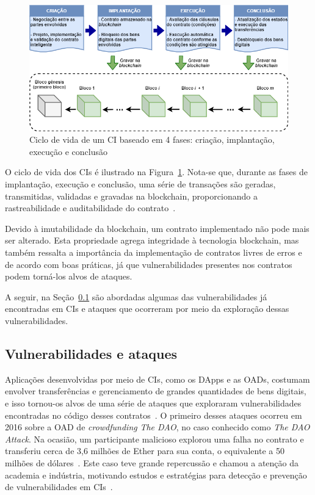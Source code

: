 \begin{figure}[htb]
 \caption{Ciclo de vida de um CI baseado em 4 fases: criação, implantação, execução e conclusão}
 \label{fig:contrato-ciclo-de-vida}
 \centering
 \includegraphics[scale=0.6]{figuras/contrato_ciclo_de_vida.png}
\end{figure}

O ciclo de vida dos CIs é ilustrado na Figura~\ref{fig:contrato-ciclo-de-vida}. Nota-se que, durante as fases de implantação, execução e conclusão, uma série de transações são geradas, transmitidas, validadas e gravadas na blockchain, proporcionando a rastreabilidade e auditabilidade do contrato~\cite{overview-smartcontracts2020zheng}.

Devido à imutabilidade da blockchain, um contrato implementado não pode mais ser alterado. Esta propriedade agrega integridade à tecnologia blockchain, mas também ressalta a importância da implementação de contratos livres de erros e de acordo com boas práticas, já que vulnerabilidades presentes nos contratos podem torná-los alvos de ataques.

A seguir, na Seção~\ref{tex:fund:ethereum:vuln-ataques} são abordadas algumas das vulnerabilidades já encontradas em CIs e ataques que ocorreram por meio da exploração dessas vulnerabilidades.  

\subsection{Vulnerabilidades e ataques} \label{tex:fund:ethereum:vuln-ataques}

Aplicações desenvolvidas por meio de CIs, como os DApps e as OADs, costumam envolver transferências e gerenciamento de grandes quantidades de bens digitais, e isso tornou-os alvos de uma série de ataques que exploraram vulnerabilidades encontradas no código desses contratos~\cite{atzei2017survey-attacks-sok, liu2019survey-ieeeaccess, chen2020survey-ethereum-acm}. O primeiro desses ataques ocorreu em 2016 sobre a OAD de \textit{crowdfunding} \textit{The DAO}, no caso conhecido como \textit{The DAO Attack}. Na ocasião, um participante malicioso explorou uma falha no contrato e transferiu cerca de 3,6 milhões de Ether para sua conta, o equivalente a 50 milhões de dólares~\cite{siegel-dao-attack}. Este caso teve grande repercussão e chamou a atenção da academia e indústria, motivando estudos e estratégias para detecção e prevenção de vulnerabilidades em CIs~\cite{chen2020survey-ethereum-acm, liu2019survey-ieeeaccess}.

